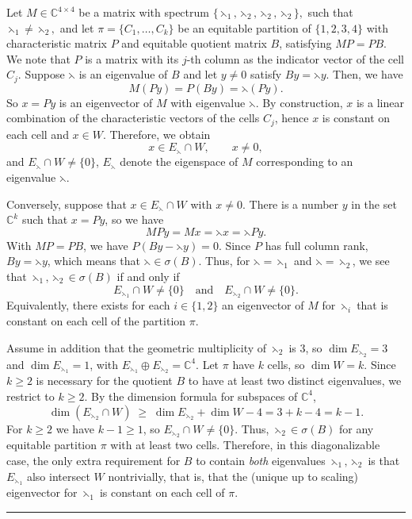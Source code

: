 \documentclass[12pt,twoside]{article}
\renewenvironment{proof}{{\noindent\bfseries Proof.}}{\qed}
\def\qed{\nolinebreak\hfill\rule{.2cm}{.2cm}\par\addvspace{.5cm}}
\begin{document}
\begin{proof} Let $M\in\mathbb{C}^{4\times 4}$ be a matrix with spectrum $\{\leftthreetimes_1,\leftthreetimes_2,\leftthreetimes_2,\leftthreetimes_2\},$ such that  $ \leftthreetimes_1\neq \leftthreetimes_2,$
	and let $\pi=\{C_1,\dots,C_k\}$ be an equitable partition of $\{1,2,3,4\}$ with
	characteristic matrix $P$ and equitable quotient matrix $B$, satisfying   $MP = PB.$
	We note that $P$ is a matrix with its $j$-th column as the indicator vector of the cell
	$C_j$.   Suppose $\leftthreetimes$ is an eigenvalue of $B$ and let
	$y\neq 0$ satisfy $B y=\leftthreetimes y$. Then, we have
	$$
	M(P y)=P(B y)=\leftthreetimes (P y).
	$$
	So $x =P y$ is an eigenvector of $M$ with eigenvalue $\leftthreetimes$. By construction,
	$x$ is a linear combination of the characteristic vectors of the cells $C_j$,
	hence $x$ is constant on each cell and $x\in W$. Therefore, we obtain
	$$
	x\in E_\leftthreetimes\cap W,\qquad x\neq 0,
	$$
	and $E_\leftthreetimes\cap W\neq\{0\}$, $E_\leftthreetimes$ denote the eigenspace of $M$ corresponding to
	an eigenvalue $\leftthreetimes$.
	
	\smallskip
	Conversely, suppose that $x\in E_\leftthreetimes\cap W$ with $x\neq 0$.
	There is a number $y$ in the set $\mathbb{C}^k$ such that $x=P y$, so we have
	$$
	M P y = M x = \leftthreetimes x = \leftthreetimes P y.
	$$
	With $MP=PB$, we have $P(B y - \leftthreetimes y)=0.$ Since $P$ has full column rank, $B y=\leftthreetimes y$, which means that $\leftthreetimes\in\sigma(B)$.
	Thus, for $\leftthreetimes=\leftthreetimes_1$ and $\leftthreetimes=\leftthreetimes_2$, we see that
	$\leftthreetimes_1,\leftthreetimes_2\in\sigma(B)$ if and only if
	$$
	E_{\leftthreetimes_1}\cap W\neq\{0\}
	\quad\text{and}\quad
	E_{\leftthreetimes_2}\cap W\neq\{0\}.
	$$
	Equivalently, there exists for each $i\in\{1,2\}$ an eigenvector of $M$ for
	$\leftthreetimes_i$ that is constant on each cell of the partition $\pi$.
	
	Assume in addition that the geometric multiplicity of $\leftthreetimes_2$ is $3$, so
	$\dim E_{\leftthreetimes_2}=3$ and $\dim E_{\leftthreetimes_1}=1$, with
	$E_{\leftthreetimes_1}\oplus E_{\leftthreetimes_2}=\mathbb{C}^4$. Let $\pi$ have $k$ cells, so
	$\dim W=k$. Since $k\ge 2$ is necessary for the quotient $B$ to have at least
	two distinct eigenvalues, we restrict to $k\ge 2$. By the dimension formula for subspaces of $\mathbb{C}^4$,
	$$
	\dim(E_{\leftthreetimes_2}\cap W)
	\;\ge\;
	\dim E_{\leftthreetimes_2} + \dim W - 4
	=
	3 + k - 4
	=
	k-1.
	$$
	For $k\ge 2$ we have $k-1\ge 1$, so $E_{\leftthreetimes_2}\cap W\neq\{0\}$. Thus,
	$\leftthreetimes_2\in\sigma(B)$ for any equitable partition $\pi$ with at least two
	cells. Therefore, in this diagonalizable case, the only extra requirement for $B$ to
	contain \emph{both} eigenvalues $\leftthreetimes_1,\leftthreetimes_2$ is that $E_{\leftthreetimes_1}$
	also intersect $W$ nontrivially, that is, that the (unique up to scaling)
	eigenvector for $\leftthreetimes_1$ is constant on each cell of $\pi$.
\end{proof}
\end{document}
